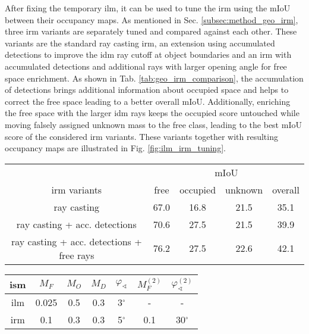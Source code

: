 After fixing the temporary \gls{ilm}, it can be used to tune the \gls{irm} using the mIoU between their occupancy maps. As mentioned in Sec. \ref{subsec:method_geo_irm}, three \gls{irm} variants are separately tuned and compared against each other. These variants are the standard ray casting \gls{irm}, an extension using accumulated detections to improve the \gls{idm} ray cutoff at object boundaries and an \gls{irm} with accumulated detections and additional rays with larger opening angle for free space enrichment. As shown in Tab. \ref{tab:geo_irm_comparison}, the accumulation of detections brings additional information about occupied space and helps to correct the free space leading to a better overall mIoU. Additionally, enriching the free space with the larger \gls{idm} rays keeps the occupied score untouched while moving falsely assigned unknown mass to the free class, leading to the best mIoU score of the considered \gls{irm} variants. These variants together with resulting occupancy maps are illustrated in Fig. \ref{fig:ilm_irm_tuning}.
\begin{center}
	\begin{tabular}{c|ccc|c}
		& \multicolumn{4}{c}{mIoU}\\
		\gls{irm} variants & free & occupied & unknown & overall \\
		\hline
		ray casting & 67.0 & 16.8 & 21.5 & 35.1\\
		ray casting + acc. detections & 70.6 & 27.5 & 21.5 & 39.9\\
		ray casting + acc. detections + free rays & 76.2 & 27.5 & 22.6 & 42.1\\		
	\end{tabular}
\end{center}
\begin{center}
	\begin{tabular}{c|c|c|c|c|c|c}
		\gls{ism} & $M_F$ & $M_O$ & $M_D$ & $\varphi_\sphericalangle$ & $M_F^{(2)}$ & $\varphi_\sphericalangle^{(2)}$ \\
		\hline
		\gls{ilm} & 0.025 & 0.5 & 0.3 & 3$^\circ$ & - & - \\
		\gls{irm} & 0.1 & 0.3 & 0.3 & 5$^\circ$ & 0.1 & 30$^\circ$ \\
	\end{tabular}
\end{center}
%
